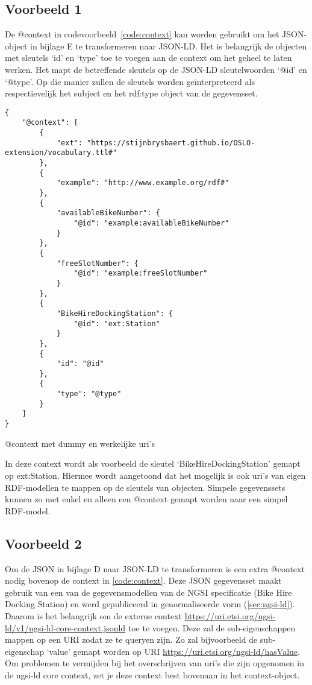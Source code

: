 \subsection{Voorbeeld 1}
\label{subsec:vb1}
De @context in codevoorbeeld~\ref{code:context} kan worden gebruikt om het JSON-object in bijlage E te transformeren naar JSON-LD. Het is belangrijk de objecten met sleutels `id' en `type' toe te voegen aan de context om het geheel te laten werken. Het mapt de betreffende sleutels op de JSON-LD sleutelwoorden `@id' en `@type'. Op die manier zullen de sleutels worden geïnterpreteerd als respectievelijk het subject en het rdf:type object van de gegevensset.

\begin{code}
\begin{verbatim}
{
    "@context": [
        {
            "ext": "https://stijnbrysbaert.github.io/OSLO-extension/vocabulary.ttl#"
        },
        {
            "example": "http://www.example.org/rdf#"
        },
        {
            "availableBikeNumber": {
                "@id": "example:availableBikeNumber"
            }
        },
        {
            "freeSlotNumber": {
                "@id": "example:freeSlotNumber"
            }
        },
        {
            "BikeHireDockingStation": {
                "@id": "ext:Station"
            }
        },
        {
            "id": "@id"
        },
        {
            "type": "@type"
        }
    ]
}
\end{verbatim}
\caption{@context met dummy en werkelijke uri's}
\label{code:context}
\end{code}

In deze context wordt als voorbeeld de sleutel `BikeHireDockingStation' gemapt op ext:Station. Hiermee wordt aangetoond dat het mogelijk is ook uri's van eigen RDF-modellen te mappen op de sleutels van objecten. Simpele gegevenssets kunnen zo met enkel en alleen een @context gemapt worden naar een simpel RDF-model. 

\subsection{Voorbeeld 2}
\label{subsec:vb2}
Om de JSON in bijlage D naar JSON-LD te transformeren is een extra @context nodig bovenop de context in \ref{code:context}. Deze JSON gegevensset maakt gebruik van een van de gegevensmodellen van de NGSI specificatie (Bike Hire Docking Station) en werd gepubliceerd in genormaliseerde vorm (\ref{sec:ngsi-ld}). Daarom is het belangrijk om de externe context \url{https://uri.etsi.org/ngsi-ld/v1/ngsi-ld-core-context.jsonld} toe te voegen. Deze zal de sub-eigenschappen mappen op een URI zodat ze te queryen zijn. Zo zal bijvoorbeeld de sub-eigenschap `value' gemapt worden op URI \url{https://uri.etsi.org/ngsi-ld/hasValue}.
Om problemen te vermijden bij het overschrijven van uri's die zijn opgenomen in de ngsi-ld core context, zet je deze context best bovenaan in het context-object.

